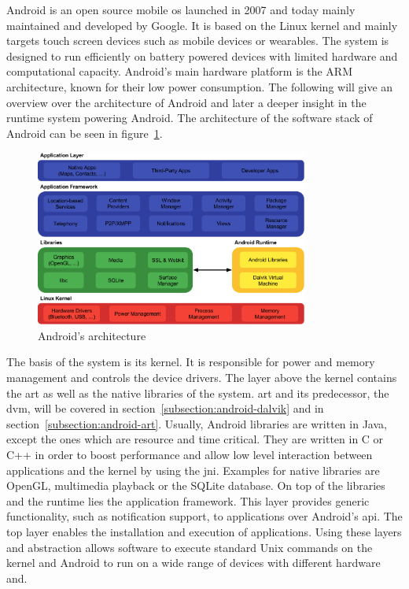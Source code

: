 Android is an open source mobile \gls{os} launched in 2007 and today mainly maintained and developed by Google.
It is based on the Linux kernel and mainly targets touch screen devices such as mobile devices or wearables.
The system is designed to run efficiently on battery powered devices with limited hardware and computational capacity.
Android's main hardware platform is the ARM architecture, known for their low power consumption.
The following will give an overview over the architecture of Android and later a deeper insight in the runtime system powering Android.
The architecture of the software stack of Android can be seen in figure~\ref{fig:androidArchitecture}.
\newline

\begin{figure}[h]
    \centering
    \includegraphics[width=0.8\textwidth]{data/stack.png}
    \caption{Android's architecture \cite{androidStack}}
    \label{fig:androidArchitecture}
\end{figure}

The basis of the system is its kernel.
It is responsible for power and memory management and controls the device drivers.
\newline
The layer above the kernel contains the \gls{art} as well as the native libraries of the system.
\gls{art} and its predecessor, the \gls{dvm}, will be covered in section~\ref{subsection:android-dalvik} and in section~\ref{subsection:android-art}.
Usually, Android libraries are written in Java, except the ones which are resource and time critical.
They are written in C or C++ in order to boost performance and allow low level interaction between applications and the kernel by using the \gls{jni}.
Examples for native libraries are OpenGL, multimedia playback or the SQLite database.
\newline
On top of the libraries and the runtime lies the application framework.
This layer provides generic functionality, such as notification support, to applications over Android's \gls{api}.
\newline
The top layer enables the installation and execution of applications.
\newline
Using these layers and abstraction allows software to execute standard Unix commands on the kernel and Android to run on a wide range of devices with different hardware and.
